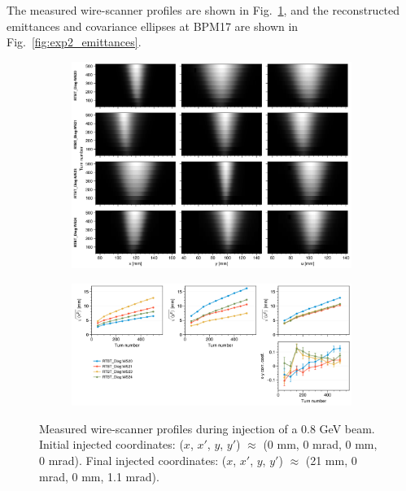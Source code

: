The measured wire-scanner profiles are shown in Fig.~\ref{fig:exp2_wsmeas}, and the reconstructed emittances and covariance ellipses at BPM17 are shown in Fig.~\ref{fig:exp2_emittances}.
%
\begin{figure}[!p]
    \centering
    \begin{subfigure}{\textwidth}
        \includegraphics[width=\textwidth]{Images/chapter5/exp2/waterfall.png}
    \end{subfigure}
    \vfill
    \vspace*{1.25cm}
    \vfill
    \begin{subfigure}{\textwidth}
        \includegraphics[width=\textwidth]{Images/chapter5/exp2/rms.png}
    \end{subfigure}
    \caption{Measured wire-scanner profiles during injection of a 0.8 GeV beam. Initial injected coordinates: ($x$, $x'$, $y$, $y'$) $\approx$ (0 mm, 0 mrad, 0 mm, 0 mrad). Final injected coordinates: ($x$, $x'$, $y$, $y'$) $\approx$ (21 mm, 0 mrad, 0 mm, 1.1 mrad).}
    \label{fig:exp2_wsmeas}
\end{figure}
